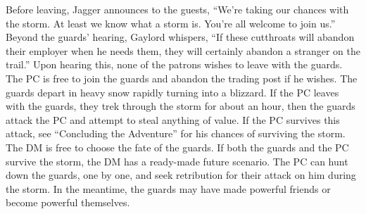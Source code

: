 \documentclass[a5paper,11pt,twoside]{book}
\begin{document}
{{{{{Before leaving, Jagger announces to the guests, “We’re taking our chances with the storm.
At least we know what a storm is.
You’re all welcome to join us.” Beyond the guards’ hearing, Gaylord whispers, “If these cutthroats will abandon their employer when he needs them, they will certainly abandon a stranger on the trail.” Upon hearing this, none of the patrons wishes to leave with the guards.
The PC is free to join the guards and abandon the trading post if he wishes.
The guards depart in heavy snow rapidly turning into a blizzard.
If the PC leaves with the guards, they trek through the storm for about an hour, then the guards attack the PC and attempt to steal anything of value.
If the PC survives this attack, see “Concluding the Adventure” for his chances of surviving the storm.
The DM is free to choose the fate of the guards.
If both the guards and the PC survive the storm, the DM has a ready-made future scenario.
The PC can hunt down the guards, one by one, and seek retribution for their attack on him during  the storm.
In the meantime, the guards may have made powerful friends or become powerful themselves.
}}}}}
\end{document}
